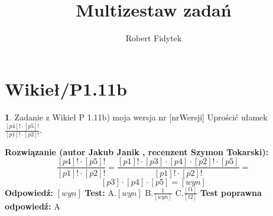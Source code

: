 \documentclass[12pt, a4paper]{article}
\title{Multizestaw zadań}
\author{Robert Fidytek}
\date{}
\theoremstyle{definition} %
\newtheorem{zad}{}
\newcommand{\kategoria}[1]{\section{#1}} %
\newcommand{\zadStart}[1]{\begin{zad}#1\newline} %
\newcommand{\zadStop}{\end{zad}}   %
\newcommand{\rozwStart}[2]{\noindent \textbf{Rozwiązanie (autor #1 , recenzent #2): }\newline} %
\newcommand{\rozwStop}{\newline}                                            %
\newcommand{\odpStart}{\noindent \textbf{Odpowiedź:}\newline}    %
\newcommand{\odpStop}{\newline}                                             %
\newcommand{\testStart}{\noindent \textbf{Test:}\newline} %
\newcommand{\testStop}{\newline} %
\newcommand{\kluczStart}{\noindent \textbf{Test poprawna odpowiedź:}\newline} %
\newcommand{\kluczStop}{\newline} %
\begin{document}
\maketitle


\kategoria{Wikieł/P1.11b}
\zadStart{Zadanie z Wikieł P 1.11b) moja wersja nr [nrWersji]}
Uprościć ułamek $\frac{[p4]!\cdot[p5]!}{[p1]!\cdot[p2]!}$.
\zadStop
\rozwStart{Jakub Janik}{Szymon Tokarski}
$$\frac{[p4]!\cdot[p5]!}{[p1]!\cdot[p2]!}=\frac{[p1]!\cdot[p3]\cdot[p4]\cdot[p2]!\cdot[p5]}{[p1]!\cdot[p2]!}= $$
$$[p3]\cdot[p4]\cdot[p5]=[wyn]$$
\rozwStop
\odpStart
$[wyn]$
\odpStop
\testStart
A.$[wyn]$
B.$\frac{1}{[wyn]}$
C.$\frac{[t1]}{[t2]}$
\testStop
\kluczStart
A
\kluczStop
\end{document}

